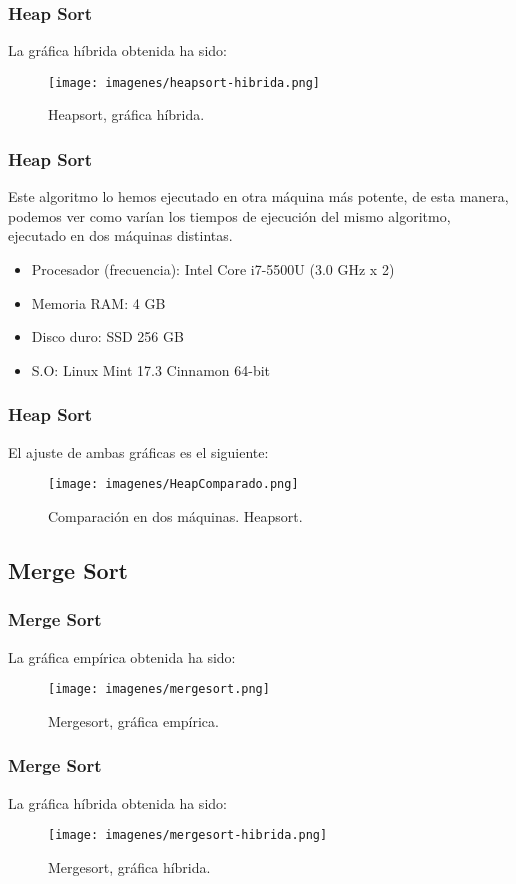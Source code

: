 \documentclass{beamer}
\begin{document}
\begin{frame}
	\frametitle{Heap Sort}
	La gráfica híbrida obtenida ha sido:
	\begin{figure}
		\centering
		\texttt{[image: imagenes/heapsort-hibrida.png]}
		\caption{Heapsort, gráfica híbrida.}
		\label{fig:E12}
	\end{figure}
\end{frame}

\begin{frame}
	\frametitle{Heap Sort}
	Este algoritmo lo hemos ejecutado en otra máquina más potente, de esta manera, podemos ver como varían los tiempos de ejecución del mismo algoritmo, ejecutado en dos máquinas distintas.
	\begin{itemize}
		\item Procesador (frecuencia): Intel Core i7-5500U (3.0 GHz x 2)
		\item Memoria RAM: 4 GB
		\item Disco duro: SSD 256 GB
		\item S.O: Linux Mint 17.3 Cinnamon 64-bit
	\end{itemize}
\end{frame}

\begin{frame}
	\frametitle{Heap Sort}
	El ajuste de ambas gráficas es el siguiente:
	\begin{figure}
		\centering
		\texttt{[image: imagenes/HeapComparado.png]}
		\caption{Comparación en dos máquinas. Heapsort.}
		\label{fig:E13}
	\end{figure}
\end{frame}
\subsection{Merge Sort}
\begin{frame}
	\frametitle{Merge Sort}
	La gráfica empírica obtenida ha sido:
	\begin{figure}
		\centering
		\texttt{[image: imagenes/mergesort.png]}
		\caption{Mergesort, gráfica empírica.}
		\label{fig:E14}
	\end{figure}
	
\end{frame}

\begin{frame}
	\frametitle{Merge Sort}
	La gráfica híbrida obtenida ha sido:
	\begin{figure}
		\centering
		\texttt{[image: imagenes/mergesort-hibrida.png]}
		\caption{Mergesort, gráfica híbrida.}
		\label{fig:E15}
	\end{figure}
\end{frame}
\end{document}
